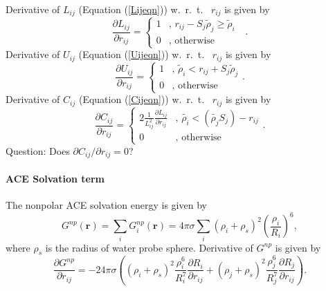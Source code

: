 \documentclass[12pt]{article}
\begin{document}
Derivative of $L_{ij}$ (Equation (\ref{Lijeqn})) w.~r.~t.~ $r_{ij}$ is given by
\begin{equation}
\frac{\partial L_{ij}}{\partial r_{ij}} = \left\{ \begin{array}{rl}
    1 &\mbox{, $r_{ij} - S_{j}\tilde{\rho}_{j} {\geq} \tilde{\rho}_{i}$ } \\
    0 &\mbox{, otherwise} 
    \end{array} \right..
\end{equation}
Derivative of $U_{ij}$ (Equation (\ref{Uijeqn})) w.~r.~t.~ $r_{ij}$ is given by
\begin{equation}
\frac{\partial U_{ij}}{\partial r_{ij}} = \left\{ \begin{array}{rl}
    1 &\mbox{, $\tilde{\rho}_{i} < r_{ij} + S_{j}\tilde{\rho}_{j}$} \\
    0 &\mbox{, otherwise}
    \end{array} \right..
\end{equation}
Derivative of $C_{ij}$ (Equation (\ref{Cijeqn})) w.~r.~t.~ $r_{ij}$ is given by
\begin{equation}
\frac{\partial C_{ij}}{\partial r_{ij}} = \left\{ \begin{array}{rl}
  2\frac{1}{L_{ij}^{2}}\frac{\partial L_{ij}}{\partial r_{ij}} &\mbox{, $\tilde{{\rho}_{i}} < ( \tilde{{\rho}_{j}}S_{j}) - r_{ij}$} \\
  0 &\mbox{, otherwise}
  \end{array} \right..
\end{equation}
Question: Does $\partial C_{ij}/\partial r_{ij}=0$?

\paragraph{ACE Solvation term}
The nonpolar ACE solvation energy is given by
\begin{equation}
\label{ACEsolvation}
G^{np}(\mathbf{r}) = \displaystyle\sum_{i}G_{i}^{np}(\mathbf{r}) = 4{\pi}{\sigma}\displaystyle\sum_{i}({\rho}_{i} + {\rho}_{s})^{2}\left(\frac{{\rho}_{i}}{R_{i}}\right)^{6},
\end{equation}
where ${\rho}_{s}$ is the radius of water probe sphere.
Derivative of $G^{np}$ is given by
\begin{equation}
\frac{\partial G^{np}}{\partial r_{ij}} = -24{\pi}{\sigma}\left( (\rho_{i} + \rho_{s})^{2}\frac{{\rho}_{i}^{6}}{R_{i}^{7}}\frac{\partial R_{i}}{\partial r_{ij}} + (\rho_{j} + \rho_{s})^{2}\frac{{\rho}_{j}^{6}}{R_{j}^{7}}\frac{\partial R_{j}}{\partial r_{ij}} \right).
\end{equation}
\end{document}
